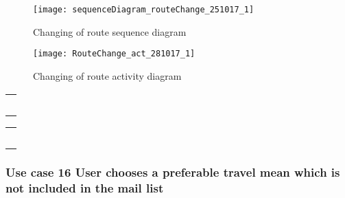 \documentclass[a4paper,leqno]{book}
\begin{document}
\newpage
\begin{figure}[!h]
	\begin{center}
		\texttt{[image: sequenceDiagram\_routeChange\_251017\_1]}
	\end{center}
	\caption{Changing of route sequence diagram}
\end{figure}

\newpage
\begin{figure}[!h]
	\begin{center}
		\texttt{[image: RouteChange\_act\_281017\_1]}
	\end{center}
	\caption{Changing of route activity diagram}
\end{figure}


\begin{tabular}[c]{@{}l@{}}\\ \\ \\ \\ \\ \\ \end{tabular}
\newpage

\begin{tabular}[c]{@{}l@{}}\\ \\ \\ \\ \\ \\ \end{tabular}
\newpage

\subsubsection{Use case 16 User chooses a preferable travel mean which is not included in the mail list}
\end{document}
